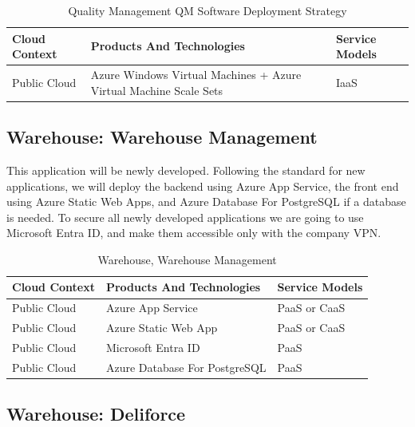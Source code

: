\documentclass{llncs}
\begin{document}
\begin{table}[h!]
    \centering
    \begin{tabular}{lll}
        \hline
        \textbf{Cloud Context} & \textbf{Products And Technologies}                                & \textbf{Service Models} \\
        \hline
        Public Cloud           & Azure Windows Virtual Machines + Azure Virtual Machine Scale Sets & IaaS                    \\
    \end{tabular}
    \caption{Quality Management QM Software Deployment Strategy}
\end{table}

\subsection{Warehouse: Warehouse Management}
This application will be newly developed. Following the standard for new applications, we will deploy the backend using Azure App Service, the front end using Azure Static Web Apps, and Azure Database For PostgreSQL if a database is needed.
To secure all newly developed applications we are going to use Microsoft Entra ID, and make them accessible only with the company VPN.\\

\begin{table}[h!]
    \centering
    \begin{tabular}{lll}
        \hline
        \textbf{Cloud Context} & \textbf{Products And Technologies} & \textbf{Service Models} \\
        \hline
        Public Cloud           & Azure App Service                  & PaaS or CaaS            \\
        \hline
        Public Cloud           & Azure Static Web App               & PaaS or CaaS            \\

        \hline
        Public Cloud           & Microsoft Entra ID                 & PaaS                    \\
        \hline
        Public Cloud           & Azure Database For PostgreSQL      & PaaS                    \\
        \hline
    \end{tabular}
    \caption{Warehouse, Warehouse Management}
\end{table}

\subsection{Warehouse: Deliforce}
\end{document}
